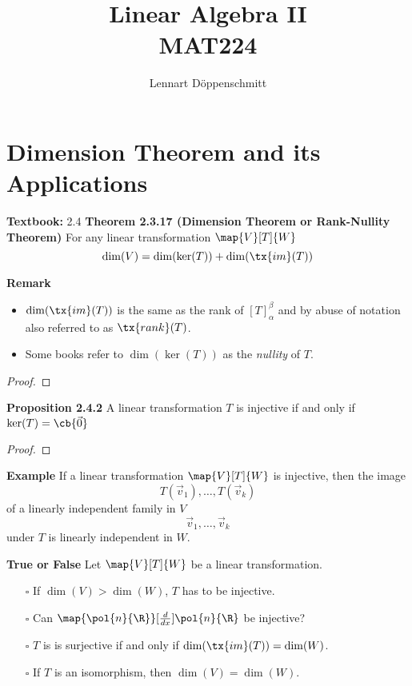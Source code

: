 \documentclass[letterpaper, 10pt]{article}
\begin{document}

\title{Linear Algebra II \\ \Large{MAT224}}
\author{Lennart Döppenschmitt}






\newpage
\section*{Dimension Theorem and its Applications}%

\textbf{Textbook:} 2.4
\lb
\textbf{Theorem 2.3.17 (Dimension Theorem or Rank-Nullity Theorem)}
\lb
For any linear transformation $\map{V}[T]{W}$
\[ \dim(V) = \dim(\ker(T)) + \dim( \tx{im}(T)) \]


\lb
\textbf{Remark} 
\begin{itemize}
    \item 
        $\dim( \tx{im}(T))$ is the same as the rank of $[T]_α^β$ and by abuse of
        notation also referred to as $\tx{rank}(T)$.
    \item
        Some books refer to $\dim(\ker(T))$ as the \emph{nullity} of $T$.
\end{itemize}

\begin{proof}
\end{proof}


\vspace{250pt}
\lb
\textbf{Proposition 2.4.2}
\lb
A linear transformation $T$ is injective if and only if $\ker(T) = \cb{\vec 0}$
\begin{proof}
\end{proof}



\newpage
\lb
\textbf{Example} 
\lb
If a linear transformation $ \map{V}[T]{W}$ is injective, then the image
\[ T( \vec v_1) , \ldots, T(\vec v_k) \]
of a linearly independent family in $V$
\[ \vec v_1 , \ldots, \vec v_k \]
under $T$ is linearly independent in $W$.






\newpage
\lb
\textbf{True or False}
\lb
Let $\map{V}[T]{W}$ be a linear transformation.
\begin{enumerate}
    \item[$\square$]
        If $\dim(V) > \dim(W)$, $T$ has to be injective.
    \item[$\square$]
        Can $ \map{\pol{n}{\R}}[\frac{d}{dx}]{\pol{n}{\R}}$ be injective?
    \item[$\square$]
        $T$ is is surjective if and only if $\dim(\tx{im}(T)) = \dim (W)$.
    \item[$\square$]
        If $T$ is an isomorphism, then $\dim(V) = \dim(W)$.
\end{enumerate}
\end{document}
